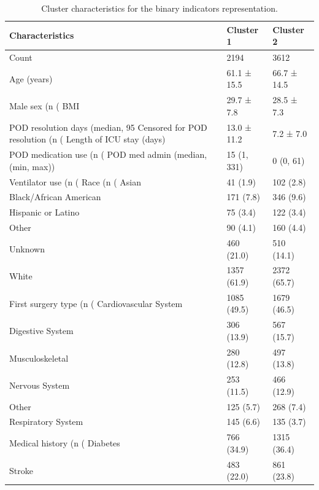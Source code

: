 \begin{table}

\caption{Cluster characteristics for the binary indicators representation.}
\centering
\begin{tabular}[t]{lll}
\toprule
Characteristics & Cluster 1 & Cluster 2\\
\midrule
Count & 2194 & 3612\\
Age (years) & 61.1 ± 15.5 & 66.7 ± 14.5\\
Male sex (n (%
BMI & 29.7 ± 7.8 & 28.5 ± 7.3\\
POD resolution days (median, 95%
\addlinespace
Censored for POD resolution (n (%
Length of ICU stay (days) & 13.0 ± 11.2 & 7.2 ± 7.0\\
POD medication use (n (%
POD med admin (median, (min, max)) & 15 (1, 331) & 0 (0, 61)\\
Ventilator use (n (%
\addlinespace
Race (n (%
Asian & 41 (1.9) & 102 (2.8)\\
Black/African American & 171 (7.8) & 346 (9.6)\\
Hispanic or Latino & 75 (3.4) & 122 (3.4)\\
Other & 90 (4.1) & 160 (4.4)\\
\addlinespace
Unknown & 460 (21.0) & 510 (14.1)\\
White & 1357 (61.9) & 2372 (65.7)\\
First surgery type (n (%
Cardiovascular System & 1085 (49.5) & 1679 (46.5)\\
Digestive System & 306 (13.9) & 567 (15.7)\\
\addlinespace
Musculoskeletal & 280 (12.8) & 497 (13.8)\\
Nervous System & 253 (11.5) & 466 (12.9)\\
Other & 125 (5.7) & 268 (7.4)\\
Respiratory System & 145 (6.6) & 135 (3.7)\\
Medical history (n (%
\addlinespace
Diabetes & 766 (34.9) & 1315 (36.4)\\
Stroke & 483 (22.0) & 861 (23.8)\\

\end{tabular}
\end{table}
